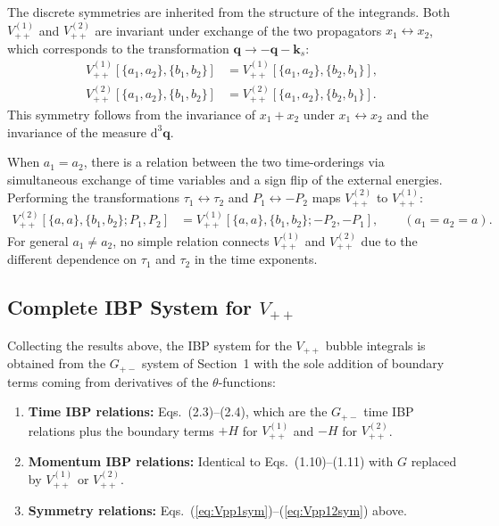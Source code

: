 \documentclass[a4paper,12pt]{article}
\def\di{{\mathrm{d}}}
\def\to{\rightarrow}
\begin{document}
The discrete symmetries are inherited from the structure of the integrands. Both $V_{++}^{(1)}$ and $V_{++}^{(2)}$ are invariant under exchange of the two propagators $x_1\leftrightarrow x_2$, which corresponds to the transformation $\bm q \to -\bm q - \bm k_s$:
\begin{align}
	V_{++}^{(1)}[\{a_1,a_2\},\{b_1,b_2\}] & = V_{++}^{(1)}[\{a_1,a_2\},\{b_2,b_1\}], \label{eq:Vpp1sym} \\
	V_{++}^{(2)}[\{a_1,a_2\},\{b_1,b_2\}] & = V_{++}^{(2)}[\{a_1,a_2\},\{b_2,b_1\}]. \label{eq:Vpp2sym}
\end{align}
This symmetry follows from the invariance of $x_1+x_2$ under $x_1\leftrightarrow x_2$ and the invariance of the measure $\di^3\bm q$.

When $a_1 = a_2$, there is a relation between the two time-orderings via simultaneous exchange of time variables and a sign flip of the external energies. Performing the transformations $\tau_1\leftrightarrow\tau_2$ and $P_1\leftrightarrow -P_2$ maps $V_{++}^{(2)}$ to $V_{++}^{(1)}$:
\begin{align}
	V_{++}^{(2)}[\{a,a\},\{b_1,b_2\}; P_1, P_2] & = V_{++}^{(1)}[\{a,a\},\{b_1,b_2\}; -P_2, -P_1], \qquad (a_1=a_2=a). \label{eq:Vpp12sym}
\end{align}
For general $a_1\neq a_2$, no simple relation connects $V_{++}^{(1)}$ and $V_{++}^{(2)}$ due to the different dependence on $\tau_1$ and $\tau_2$ in the time exponents.

\subsection{Complete IBP System for $V_{++}$}

Collecting the results above, the IBP system for the $V_{++}$ bubble integrals is obtained from the $G_{+-}$ system of Section~1 with the sole addition of boundary terms coming from derivatives of the $\theta$-functions:

\begin{enumerate}
	\item \textbf{Time IBP relations:} Eqs.~(2.3)--(2.4), which are the $G_{+-}$ time IBP relations plus the boundary terms $+H$ for $V_{++}^{(1)}$ and $-H$ for $V_{++}^{(2)}$.
	\item \textbf{Momentum IBP relations:} Identical to Eqs.~(1.10)--(1.11) with $G$ replaced by $V_{++}^{(1)}$ or $V_{++}^{(2)}$.
	\item \textbf{Symmetry relations:} Eqs.~(\ref{eq:Vpp1sym})--(\ref{eq:Vpp12sym}) above.
\end{enumerate}
\end{document}
